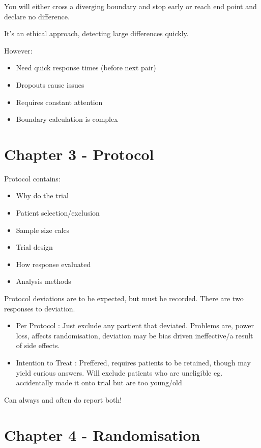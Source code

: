 \documentclass[
  letterpaper,
  DIV=11,
  numbers=noendperiod]{scrreprt}
\providecommand{\tightlist}{%
  \setlength{\itemsep}{0pt}\setlength{\parskip}{0pt}}\usepackage{longtable,booktabs,array}
\begin{document}
You will either cross a diverging boundary and stop early or reach end
point and declare no difference.

It's an ethical approach, detecting large differences quickly.

However:

\begin{itemize}
\tightlist
\item
  Need quick response times (before next pair)
\item
  Dropouts cause issues
\item
  Requires constant attention
\item
  Boundary calculation is complex
\end{itemize}

\hypertarget{chapter-3---protocol}{%
\section{Chapter 3 - Protocol}\label{chapter-3---protocol}}

Protocol contains:

\begin{itemize}
\tightlist
\item
  Why do the trial
\item
  Patient selection/exclusion
\item
  Sample size calcs
\item
  Trial design
\item
  How response evaluated
\item
  Analysis methods
\end{itemize}

Protocol deviations are to be expected, but must be recorded. There are
two responses to deviation.

\begin{itemize}
\tightlist
\item
  Per Protocol : Just exclude any partient that deviated. Problems are,
  power loss, affects randomisation, deviation may be bias driven
  ineffective/a result of side effects.
\item
  Intention to Treat : Preffered, requires patients to be retained,
  though may yield curious answers. Will exclude patients who are
  uneligible eg. accidentally made it onto trial but are too young/old
\end{itemize}

Can always and often do report both!

\hypertarget{chapter-4---randomisation}{%
\section{Chapter 4 - Randomisation}\label{chapter-4---randomisation}}
\end{document}
